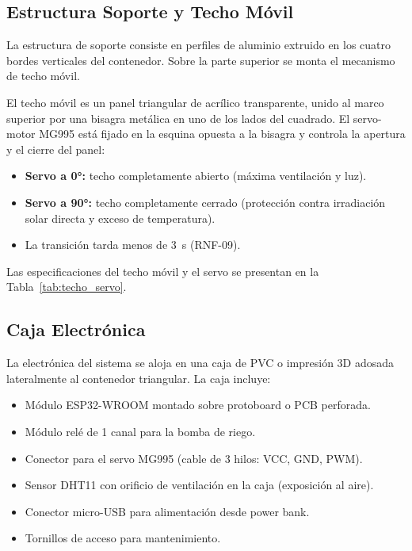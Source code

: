 

\subsection{Estructura Soporte y Techo Móvil}

La estructura de soporte consiste en perfiles de aluminio extruido en los cuatro bordes verticales del contenedor. Sobre la parte superior se monta el mecanismo de techo móvil.

El techo móvil es un panel triangular de acrílico transparente, unido al marco superior por una bisagra metálica en uno de los lados del cuadrado. El servo-motor MG995 está fijado en la esquina opuesta a la bisagra y controla la apertura y el cierre del panel:

\begin{itemize}
    \item \textbf{Servo a 0°:} techo completamente abierto (máxima ventilación y luz).
    \item \textbf{Servo a 90°:} techo completamente cerrado (protección contra irradiación solar directa y exceso de temperatura).
    \item La transición tarda menos de 3~s (RNF-09).
\end{itemize}

Las especificaciones del techo móvil y el servo se presentan en la Tabla~\ref{tab:techo_servo}.



\subsection{Caja Electrónica}

La electrónica del sistema se aloja en una caja de PVC o impresión 3D adosada lateralmente al contenedor triangular. La caja incluye:

\begin{itemize}
    \item Módulo ESP32-WROOM montado sobre protoboard o PCB perforada.
    \item Módulo relé de 1 canal para la bomba de riego.
    \item Conector para el servo MG995 (cable de 3 hilos: VCC, GND, PWM).
    \item Sensor DHT11 con orificio de ventilación en la caja (exposición al aire).
    \item Conector micro-USB para alimentación desde power bank.
    \item Tornillos de acceso para mantenimiento.
\end{itemize}

